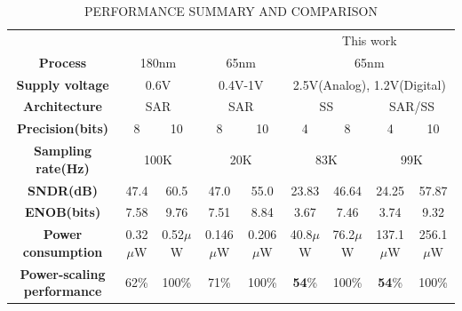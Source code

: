 \begin{table}[htbp]
	\caption{PERFORMANCE SUMMARY AND COMPARISON}
	\begin{center}
		\begin{tabular}{|c|c|c|c|c|c|c|c|c|}
			\hline
			\textbf{}& \multicolumn{2}{|c|}{\cite{zhu_6--10-bit_2015}} & \multicolumn{2}{|c|}{\cite{zhu_6--10-bit_2015}} & \multicolumn{4}{|c|}{This work} \\
			\hhline{|=========|}
			\textbf{Process}& \multicolumn{2}{|c|}{180nm} & \multicolumn{2}{|c|}{65nm} & \multicolumn{4}{|c|}{65nm} \\
			\hline 
			\textbf{Supply voltage}& \multicolumn{2}{|c|}{0.6V} & \multicolumn{2}{|c|}{0.4V-1V} & \multicolumn{4}{|c|}{2.5V(Analog), 1.2V(Digital)} \\
			\hline
			
			\textbf{Architecture}& \multicolumn{2}{|c|}{SAR} & \multicolumn{2}{|c|}{SAR} & \multicolumn{2}{|c|}{SS} & \multicolumn{2}{|c|}{SAR/SS}\\
			\hline
			\textbf{Precision(bits)} & 8 & 10 & 8 & 10 & 4 & 8 & 4 & 10 \\
			\hline
			\textbf{Sampling rate(Hz)}& \multicolumn{2}{|c|}{100K} & \multicolumn{2}{|c|}{20K} & \multicolumn{2}{|c|}{83K} & \multicolumn{2}{|c|}{99K} \\
			\hline
			\textbf{SNDR(dB)} & 47.4 & 60.5 & 47.0 & 55.0 & 23.83 & 46.64 & 24.25 & 57.87 \\
			\hline
			\textbf{ENOB(bits)}& 7.58 & 9.76 & 7.51 & 8.84 & 3.67 & 7.46 & 3.74 & 9.32 \\
			\hline
			\textbf{Power consumption}& 0.32$\mu$W & 0.52$\mu$W &  0.146$\mu$W & 0.206$\mu$W & 40.8$\mu$W & 76.2$\mu$W & 137.1$\mu$W & 256.1$\mu$W\\
			\hline
			\textbf{Power-scaling performance}& 62\% & 100\% & 71\% & 100\% & \textbf{54}\% & 100\% & \textbf{54}\% & 100\% \\
			\hline
		\end{tabular}
		\label{tab1}
	\end{center}
\end{table}
